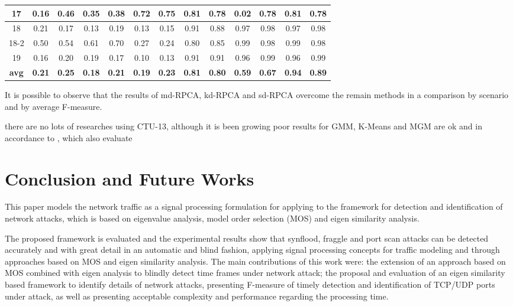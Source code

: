 \documentclass[review]{elsarticle}
\begin{document}
\begin{table}[h!]
\begin{tabular}{ c|c c|c c|c c|c c|c c|c c }
		17 & 0.16 & 0.46 & 0.35 & 0.38 & 0.72 & 0.75 & 0.81 & 0.78 & 0.02 & 0.78 & 0.81 & 0.78 \\ \hline
		18 & 0.21 & 0.17 & 0.13 & 0.19 & 0.13 & 0.15 & 0.91 & 0.88 & 0.97 & 0.98 & 0.97 & 0.98 \\ \hline
		18-2 & 0.50 & 0.54 & 0.61 & 0.70 & 0.27 & 0.24 & 0.80 & 0.85 & 0.99 & 0.98 & 0.99 & 0.98 \\ \hline
		19 & 0.16 & 0.20 & 0.19 & 0.17 & 0.10 & 0.13 & 0.91 & 0.91 & 0.96 & 0.99 & 0.96 & 0.99 \\ \hline
		\rowcolor{Gray} \textbf{avg} &\textbf{0.21} &\textbf{0.25} &\textbf{0.18} & \textbf{0.21} & \textbf{0.19} &\textbf{0.23} &\textbf{0.81} &\textbf{0.80} &\textbf{0.59} &\textbf{0.67} &\textbf{0.94} &\textbf{0.89} \\
    \bottomrule
  \end{tabular}
\end{table}

It is possible to observe that the results of md-RPCA, kd-RPCA and sd-RPCA overcome the remain methods in a comparison by scenario and by average F-measure. 

there are no lots of researches using CTU-13, although it is been growing poor results for GMM, K-Means and MGM are ok and in accordance to \cite{wang2017botnet}, which also evaluate \cite{gu2007bothunter}

\section{Conclusion and Future Works}
\label{sec:conclusionandfutureworks}

This paper models the network traffic as a signal processing formulation for applying to the framework for detection and identification of network attacks, which is based on eigenvalue analysis, model order selection (MOS) and eigen similarity analysis.

The proposed framework is evaluated and the experimental results show that synflood, fraggle and port scan attacks can be detected accurately and with great detail in an automatic and blind fashion, applying signal processing concepts for traffic modeling and through approaches based on MOS and eigen similarity analysis. The main contributions of this work were: the extension of an approach based on MOS combined with eigen analysis to blindly detect time frames under network attack; the proposal and evaluation of an eigen similarity based framework to identify details of network attacks, presenting F-measure of timely detection and identification of TCP/UDP ports under attack, as well as presenting acceptable complexity and performance regarding the processing time.
\end{document}
